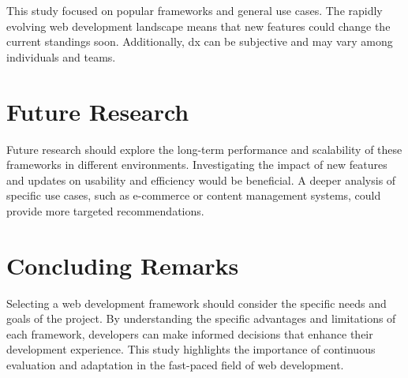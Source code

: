 This study focused on popular frameworks and general use cases. The rapidly evolving web development landscape means that new features could change the current standings soon. Additionally, \acrshort{dx} can be subjective and may vary among individuals and teams.

\section{Future Research}

Future research should explore the long-term performance and scalability of these frameworks in different environments. Investigating the impact of new features and updates on usability and efficiency would be beneficial. A deeper analysis of specific use cases, such as e-commerce or content management systems, could provide more targeted recommendations.

\section{Concluding Remarks}

Selecting a web development framework should consider the specific needs and goals of the project. By understanding the specific advantages and limitations of each framework, developers can make informed decisions that enhance their development experience. This study highlights the importance of continuous evaluation and adaptation in the fast-paced field of web development.
